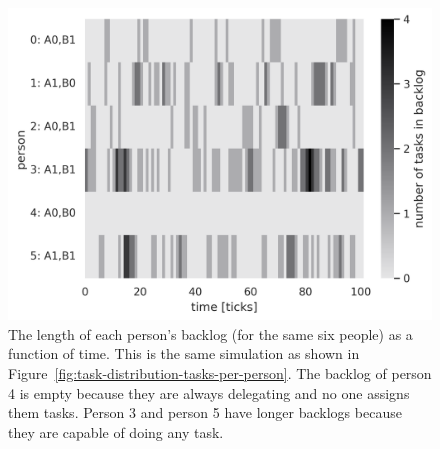 \begin{figure}[H] %
\centering
\iftoggle{narrowpage}{\newcommand\imgwidth{1}}{\newcommand\imgwidth{0.7}}
\includegraphics[width=\imgwidth\textwidth]{images/task_distribution_backlog_length_per_person_simCount1_skills2_levels1_taskduration1_people6_social0_ticks100.png}
\caption{The length of each person's backlog (for the same six people) as a function of time. This is the same simulation as shown in Figure~\ref{fig:task-distribution-tasks-per-person}. The backlog of person 4 is empty because they are always delegating and no one assigns them tasks. Person 3 and person 5 have longer backlogs because they are capable of doing any task.}
\label{fig:task-distribution-backlog-length}
\end{figure}





